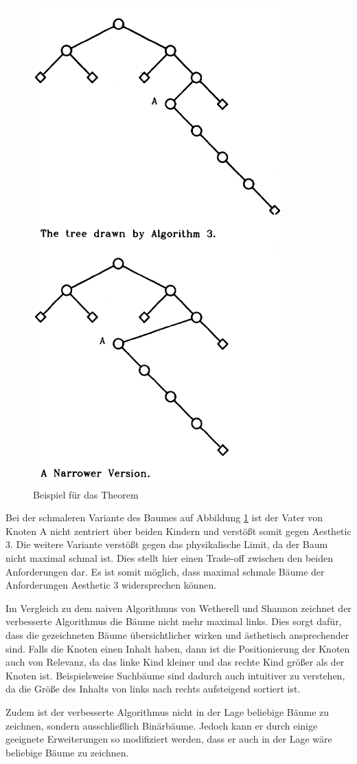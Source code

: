 \begin{figure}[H]
    \centering
    \includegraphics[scale = 0.75]{abbildungen/baum_theorem_uglification}
    \caption{Beispiel für das Theorem\cite[]{q1}}
    \label{pic:baum_theorem_uglification} 
\end{figure}

Bei der schmaleren Variante des Baumes auf Abbildung \ref{pic:baum_theorem_uglification} ist der Vater von Knoten A nicht zentriert
über beiden Kindern und verstößt somit gegen Aesthetic 3. Die weitere Variante verstößt gegen das physikalische Limit, da der Baum nicht
maximal schmal ist. Dies stellt hier einen Trade-off zwischen den beiden Anforderungen dar. Es ist somit möglich, dass maximal schmale Bäume der
Anforderungen Aesthetic 3 widersprechen können. 

Im Vergleich zu dem naiven Algorithmus von Wetherell und Shannon zeichnet der verbesserte Algorithmus die Bäume nicht mehr maximal links.
Dies sorgt dafür, dass die gezeichneten Bäume übersichtlicher wirken und ästhetisch ansprechender sind. Falls die Knoten einen Inhalt haben, dann
ist die Positionierung der Knoten auch von Relevanz, da das linke Kind kleiner und das rechte Kind größer als der Knoten ist. Beispielsweise
Suchbäume sind dadurch auch intuitiver zu verstehen, da die Größe des Inhalts von links nach rechts aufsteigend sortiert ist. 

Zudem ist der verbesserte Algorithmus nicht in der Lage beliebige Bäume zu zeichnen, sondern ausschließlich Binärbäume. Jedoch kann er durch
einige geeignete Erweiterungen so modifiziert werden, dass er auch in der Lage wäre beliebige Bäume zu zeichnen.
